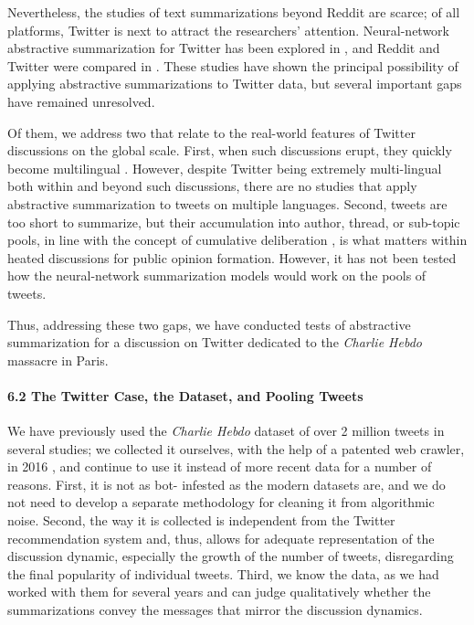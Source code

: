 Nevertheless, the studies of text summarizations beyond Reddit are scarce; of all platforms, Twitter is next to attract the researchers’ attention. Neural-network abstractive summarization for Twitter has been explored in \cite{LiZhang}, and Reddit and Twitter were compared in \cite{PriyaSequeiraChandra}. These studies have shown the principal possibility of applying abstractive summarizations to Twitter data, but several important gaps have remained unresolved.

Of them, we address two that relate to the real-world features of Twitter discussions on the global scale. First, when such discussions erupt, they quickly become multilingual \cite{BodrunovaSmoliarovaBlekanov}. However, despite Twitter being extremely multi-lingual both within and beyond such discussions, there are no studies that apply abstractive summarization to tweets on multiple languages. Second, tweets are too short to summarize, but their accumulation into author, thread, or sub-topic pools, in line with the concept of cumulative deliberation \cite{Bodrunova2021Social}, is what matters within heated discussions for public opinion formation. However, it has not been tested how the neural-network summarization models would work on the pools of tweets.

Thus, addressing these two gaps, we have conducted tests of abstractive summarization for a discussion on Twitter dedicated to the \textit{Charlie Hebdo} massacre in Paris.

\paragraph{6.2 The Twitter Case, the Dataset, and Pooling Tweets}
We have previously used the \textit{Charlie Hebdo} dataset of over 2 million tweets in several studies; we collected it ourselves, with the help of a patented web crawler, in 2016 \cite{BodrunovaSmoliarovaBlekanov}, and continue to use it instead of more recent data for a number of reasons. First, it is not as bot- infested as the modern datasets are, and we do not need to develop a separate methodology for cleaning it from algorithmic noise. Second, the way it is collected is independent from the Twitter recommendation system and, thus, allows for adequate representation of the discussion dynamic, especially the growth of the number of tweets, disregarding the final popularity of individual tweets. Third, we know the data, as we had worked with them for several years and can judge qualitatively whether the summarizations convey the messages that mirror the discussion dynamics.

